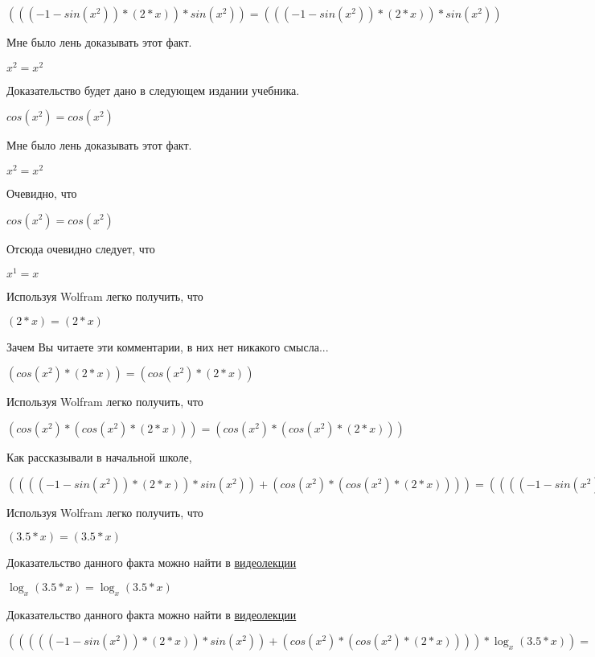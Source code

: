 \documentclass[12pt,a4paper,fleqn]{article}
\theoremstyle{definition}
\begin{document}
$((( -1  - sin({ x }^{ 2 })) * ( 2  *  x )) * sin({ x }^{ 2 })) = ((( -1  - sin({ x }^{ 2 })) * ( 2  *  x )) * sin({ x }^{ 2 }))$

Мне было лень доказывать этот факт.

${ x }^{ 2 } = { x }^{ 2 }$

Доказательство будет дано в следующем издании учебника.

$cos({ x }^{ 2 }) = cos({ x }^{ 2 })$

Мне было лень доказывать этот факт.

${ x }^{ 2 } = { x }^{ 2 }$

Очевидно, что

$cos({ x }^{ 2 }) = cos({ x }^{ 2 })$

Отсюда очевидно следует, что

${ x }^{ 1 } =  x $

Используя Wolfram легко получить, что

$( 2  *  x ) = ( 2  *  x )$

Зачем Вы читаете эти комментарии, в них нет никакого смысла...

$(cos({ x }^{ 2 }) * ( 2  *  x )) = (cos({ x }^{ 2 }) * ( 2  *  x ))$

Используя Wolfram легко получить, что

$(cos({ x }^{ 2 }) * (cos({ x }^{ 2 }) * ( 2  *  x ))) = (cos({ x }^{ 2 }) * (cos({ x }^{ 2 }) * ( 2  *  x )))$

Как рассказывали в начальной школе,

$(((( -1  - sin({ x }^{ 2 })) * ( 2  *  x )) * sin({ x }^{ 2 })) + (cos({ x }^{ 2 }) * (cos({ x }^{ 2 }) * ( 2  *  x )))) = (((( -1  - sin({ x }^{ 2 })) * ( 2  *  x )) * sin({ x }^{ 2 })) + (cos({ x }^{ 2 }) * (cos({ x }^{ 2 }) * ( 2  *  x ))))$

Используя Wolfram легко получить, что

$( 3.5  *  x ) = ( 3.5  *  x )$

Доказательство данного факта можно найти в \href{https://www.youtube.com/watch?v=dQw4w9WgXcQ}{видеолекции}

$\log_{ x }{( 3.5  *  x )} = \log_{ x }{( 3.5  *  x )}$

Доказательство данного факта можно найти в \href{https://www.youtube.com/watch?v=dQw4w9WgXcQ}{видеолекции}

$((((( -1  - sin({ x }^{ 2 })) * ( 2  *  x )) * sin({ x }^{ 2 })) + (cos({ x }^{ 2 }) * (cos({ x }^{ 2 }) * ( 2  *  x )))) * \log_{ x }{( 3.5  *  x )}) = ((((( -1  - sin({ x }^{ 2 })) * ( 2  *  x )) * sin({ x }^{ 2 })) + (cos({ x }^{ 2 }) * (cos({ x }^{ 2 }) * ( 2  *  x )))) * \log_{ x }{( 3.5  *  x )})$
\end{document}
